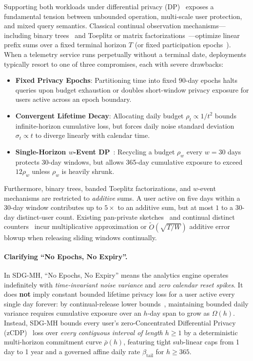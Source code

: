 \documentclass[sigconf, nonacm]{acmart}
\begin{document}
Supporting both workloads under differential privacy (DP)~\cite{dwork2006calibrating,dwork2014algorithmic} exposes a fundamental tension between unbounded operation, multi-scale user protection, and mixed query semantics. Classical continual observation mechanisms---including binary trees~\cite{dwork2010continual,chan2011private,honaker2015efficient} and Toeplitz or matrix factorizations~\cite{li2015matrix,denisov2022improved,fichtenberger2023constant,choquette2023banded}---optimize linear prefix sums over a fixed terminal horizon $T$ (or fixed participation epochs~\cite{choquette2023multiepoch}). When a telemetry service runs perpetually without a terminal date, deployments typically resort to one of three compromises, each with severe drawbacks:
\begin{itemize}[leftmargin=*, nosep, topsep=2pt]
    \item \textbf{Fixed Privacy Epochs}: Partitioning time into fixed 90-day epochs halts queries upon budget exhaustion or doubles short-window privacy exposure for users active across an epoch boundary.
    \item \textbf{Convergent Lifetime Decay}: Allocating daily budget $\rho_t \propto 1/t^2$ bounds infinite-horizon cumulative loss, but forces daily noise standard deviation $\sigma_t \propto t$ to diverge linearly with calendar time.
    \item \textbf{Single-Horizon $w$-Event DP}~\cite{kellaris2014wevent}: Recycling a budget $\rho_w$ every $w=30$ days protects 30-day windows, but allows 365-day cumulative exposure to exceed $12\rho_w$ unless $\rho_w$ is heavily shrunk.
\end{itemize}
Furthermore, binary trees, banded Toeplitz factorizations, and $w$-event mechanisms are restricted to \emph{additive} sums. A user active on five days within a 30-day window contributes up to $5\times$ to an additive sum, but at most $1$ to a 30-day distinct-user count. Existing pan-private sketches~\cite{mir2011panprivate} and continual distinct counters~\cite{epasto2023frequency,ghazi2023distinct,jain2023turnstile} incur multiplicative approximation or $\tilde{O}(\sqrt{T/W})$ additive error blowup when releasing sliding windows continually.

\paragraph{Clarifying ``No Epochs, No Expiry''.}
In SDG-MH, ``No Epochs, No Expiry'' means the analytics engine operates indefinitely with \emph{time-invariant noise variance} and \emph{zero calendar reset spikes}. It does \textbf{not} imply constant bounded lifetime privacy loss for a user active every single day forever: by continual-release lower bounds~\cite{dwork2010continual,chan2011private,kellaris2014wevent}, maintaining bounded daily variance requires cumulative exposure over an $h$-day span to grow as $\Omega(h)$. Instead, SDG-MH bounds every user's zero-Concentrated Differential Privacy (zCDP)~\cite{bun2016concentrated} loss over \emph{every contiguous interval of length $h \ge 1$} by a deterministic multi-horizon commitment curve $\bar{\rho}(h)$, featuring tight sub-linear caps from 1 day to 1 year and a governed affine daily rate $\beta_{\mathrm{tail}}$ for $h \ge 365$.
\end{document}
